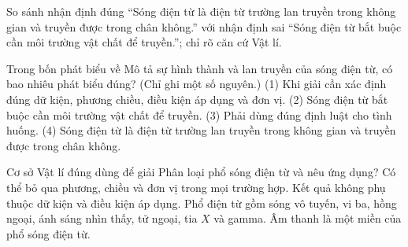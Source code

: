 \begin{bt}
So sánh nhận định đúng “Sóng điện từ là điện từ trường lan truyền trong không gian và truyền được trong chân không.” với nhận định sai “Sóng điện từ bắt buộc cần môi trường vật chất để truyền.”; chỉ rõ căn cứ Vật lí.
\end{bt}

\begin{ex}
Trong bốn phát biểu về Mô tả sự hình thành và lan truyền của sóng điện từ, có bao nhiêu phát biểu đúng? (Chỉ ghi một số nguyên.) (1) Khi giải cần xác định đúng dữ kiện, phương chiều, điều kiện áp dụng và đơn vị. (2) Sóng điện từ bắt buộc cần môi trường vật chất để truyền. (3) Phải dùng đúng định luật cho tình huống. (4) Sóng điện từ là điện từ trường lan truyền trong không gian và truyền được trong chân không.
\end{ex}

\begin{ex}
Cơ sở Vật lí đúng dùng để giải Phân loại phổ sóng điện từ và nêu ứng dụng?
\choice
{Có thể bỏ qua phương, chiều và đơn vị trong mọi trường hợp.}
{Kết quả không phụ thuộc dữ kiện và điều kiện áp dụng.}
{\True Phổ điện từ gồm sóng vô tuyến, vi ba, hồng ngoại, ánh sáng nhìn thấy, tử ngoại, tia $X$ và gamma.}
{Âm thanh là một miền của phổ sóng điện từ.}
\end{ex}

